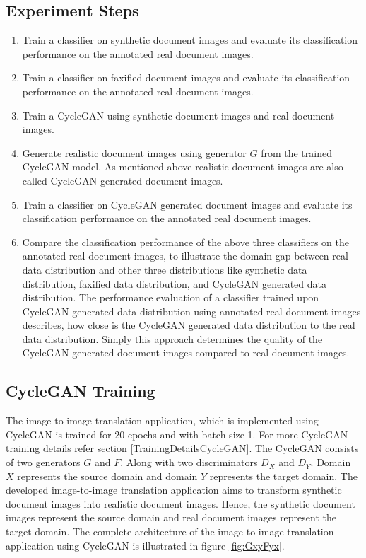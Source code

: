 \subsection{Experiment Steps}


\begin{enumerate}
    \itemsep0em 
    \item Train a classifier on synthetic document images and evaluate its classification performance on the annotated real document images.
    \item Train a classifier on faxified document images and evaluate its classification performance on the annotated real document images.
    \item Train a \ac{CycleGAN} using synthetic document images and real document images.
    \item Generate realistic document images using generator $G$ from the trained \ac{CycleGAN} model. As mentioned above realistic document images are also called \ac{CycleGAN} generated document images.
    \item Train a classifier on \ac{CycleGAN} generated document images and evaluate its classification performance on the annotated real document images.
    \item Compare the classification performance of the above three classifiers on the annotated real document images, to illustrate the domain gap between real data distribution and other three distributions like synthetic data distribution, faxified data distribution, and \ac{CycleGAN} generated data distribution. The performance evaluation of a classifier trained upon \ac{CycleGAN} generated data distribution using annotated real document images describes, how close is the \ac{CycleGAN} generated data distribution to the real data distribution. Simply this approach determines the quality of the \ac{CycleGAN} generated document images compared to real document images.
\end{enumerate}


\subsection{\ac{CycleGAN} Training}

The image-to-image translation application, which is implemented using \ac{CycleGAN} is trained for 20 epochs and with batch size 1. For more \ac{CycleGAN} training details refer section \ref{TrainingDetailsCycleGAN}. The \ac{CycleGAN} consists of two generators $G$ and $F$. Along with two discriminators $D_X$ and $D_Y$. Domain $X$ represents the source domain and domain $Y$ represents the target domain. The developed image-to-image translation application aims to transform synthetic document images into realistic document images. Hence, the synthetic document images represent the source domain and real document images represent the target domain. The complete architecture of the image-to-image translation application using \ac{CycleGAN} is illustrated in figure \ref{fig:GxyFyx}.

